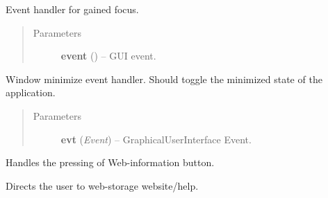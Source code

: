 \documentclass[letterpaper,10pt,english]{sphinxmanual}
\begin{document}
\begin{fulllineitems}
\begin{fulllineitems}
\begin{quote}
\begin{description}
\end{description}\end{quote}

\end{fulllineitems}


\begin{fulllineitems}
\label{diwacs:diwacs.GraphicalUserInterface.OnFocus}
Event handler for gained focus.
\begin{quote}\begin{description}
\item[{Parameters}] \leavevmode
\textbf{event} () -- GUI event.

\end{description}\end{quote}

\end{fulllineitems}


\begin{fulllineitems}
\label{diwacs:diwacs.GraphicalUserInterface.OnIconify}
Window minimize event handler.
Should toggle the minimized state of the application.
\begin{quote}\begin{description}
\item[{Parameters}] \leavevmode
\textbf{evt} (\emph{Event}) -- GraphicalUserInterface Event.

\end{description}\end{quote}

\end{fulllineitems}


\begin{fulllineitems}
\label{diwacs:diwacs.GraphicalUserInterface.OnInfoBtn}
Handles the pressing of Web-information button.

Directs the user to web-storage website/help.

\end{fulllineitems}



\end{fulllineitems}
\end{document}
